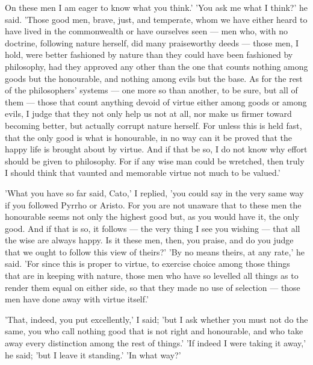  On these men I am eager to know what you think.' 'You ask me what I think?' he said. 'Those good men, brave, just, and temperate, whom we have either heard to have lived in the commonwealth or have ourselves seen — men who, with no doctrine, following nature herself, did many praiseworthy deeds — those men, I hold, were better fashioned by nature than they could have been fashioned by philosophy, had they approved any other than the one that counts nothing among goods but the honourable, and nothing among evils but the base. As for the rest of the philosophers' systems — one more so than another, to be sure, but all of them — those that count anything devoid of virtue either among goods or among evils, I judge that they not only help us not at all, nor make us firmer toward becoming better, but actually corrupt nature herself. For unless this is held fast, that the only good is what is honourable, in no way can it be proved that the happy life is brought about by virtue. And if that be so, I do not know why effort should be given to philosophy. For if any wise man could be wretched, then truly I should think that vaunted and memorable virtue not much to be valued.'

 'What you have so far said, Cato,' I replied, 'you could say in the very same way if you followed Pyrrho or Aristo. For you are not unaware that to these men the honourable seems not only the highest good but, as you would have it, the only good. And if that is so, it follows — the very thing I see you wishing — that all the wise are always happy. Is it these men, then, you praise, and do you judge that we ought to follow this view of theirs?' 'By no means theirs, at any rate,' he said. 'For since this is proper to virtue, to exercise choice among those things that are in keeping with nature, those men who have so levelled all things as to render them equal on either side, so that they made no use of selection — those men have done away with virtue itself.'

 'That, indeed, you put excellently,' I said; 'but I ask whether you must not do the same, you who call nothing good that is not right and honourable, and who take away every distinction among the rest of things.' 'If indeed I were taking it away,' he said; 'but I leave it standing.' 'In what way?'

